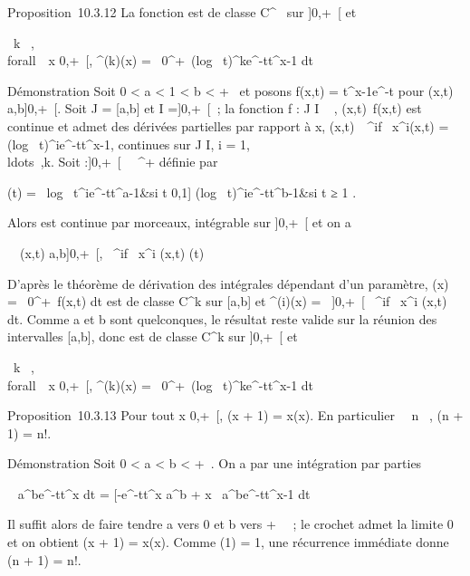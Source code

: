 Proposition~10.3.12 La fonction \Gamma est de classe C^\infty~ sur
{]}0,+\infty~{[} et

\forall~k \in {}~, \\forall~~x
\in{]}0,+\infty~{[}, \Gamma^(k)(x) =\int ~
0^+\infty~(log~
t)^ke^-tt^x-1 dt

Démonstration Soit 0 \textless{} a \textless{} 1 \textless{} b
\textless{} +\infty~ et posons f(x,t) = t^x-1e^-t pour
(x,t) \in {[}a,b{]}\times{]}0,+\infty~{[}. Soit J = {[}a,b{]} et I ={]}0,+\infty~{[}~; la
fonction f : J \times I \rightarrow~ , (x,t)\mapsto~f(x,t) est
continue et admet des dérivées partielles par rapport à x,
(x,t)\mapsto~\partial~^if\over
\partial~x^i(x,t) = (log~
t)^ie^-tt^x-1, continues sur J \times I, i =
1,\\ldots~,k. Soit
\phii :{]}0,+\infty~{[}\rightarrow~ ~^+ définie par

 \phii(t) = \left \
\cases \textbar{}log~
t\textbar{}^ie^-tt^a-1&si t \in{]}0,1{]}
\cr (log~
t)^ie^-tt^b-1&si t ≥ 1 
\right .

Alors \phii est continue par morceaux, intégrable sur {]}0,+\infty~{[}
et on a

\forall~~(x,t) \in {[}a,b{]}\times{]}0,+\infty~{[}, \textbar{}
\partial~^if \over \partial~x^i (x,t)\textbar{}\leq
\phii(t)

D'après le théorème de dérivation des intégrales dépendant d'un
paramètre, \Gamma(x) =\int ~
0^+\infty~f(x,t) dt est de classe C^k sur {[}a,b{]}
et \Gamma^(i)(x) =\int ~
{]}0,+\infty~{[} \partial~^if \over
\partial~x^i (x,t) dt. Comme a et b sont quelconques, le résultat
reste valide sur la réunion des intervalles {[}a,b{]}, donc \Gamma est de
classe C^k sur {]}0,+\infty~{[} et

\forall~k \in {}~, \\forall~~x
\in{]}0,+\infty~{[}, \Gamma^(k)(x) =\int ~
0^+\infty~(log~
t)^ke^-tt^x-1 dt

Proposition~10.3.13 Pour tout x \in{]}0,+\infty~{[}, \Gamma(x + 1) = x\Gamma(x). En
particulier \forall~~n \in \mathbb{N}~, \Gamma(n + 1) = n!.

Démonstration Soit 0 \textless{} a \textless{} b \textless{} +\infty~. On a
par une intégration par parties

\int ~
a^be^-tt^x dt =
\left
{[}-e^-tt^x\right {]}
a^b + x\int ~
a^be^-tt^x-1 dt

Il suffit alors de faire tendre a vers 0 et b vers + \infty~~; le crochet
admet la limite 0 et on obtient \Gamma(x + 1) = x\Gamma(x). Comme \Gamma(1) = 1, une
récurrence immédiate donne \Gamma(n + 1) = n!.

